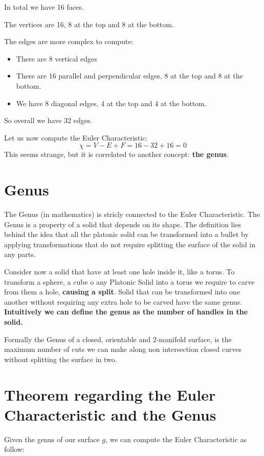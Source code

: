 In total we have 16 faces.\par

The vertices are 16, 8 at the top and 8 at the bottom.\par

The edges are more complex to compute:
\begin{itemize}
    \item There are 8 vertical edges
    \item There are 16 parallel and perpendicular edges, 8 at the top and 8 at the bottom.
    \item We have 8 diagonal edges, 4 at the top and 4 at the bottom.
\end{itemize}

So overall we have 32 edges.\par
Let us now compute the Euler Characteristic:
\begin{equation*}
    \chi = V - E + F = 16 - 32 + 16 = 0 
\end{equation*}
This seems strange, but it is correlated to another concept: \textbf{the genus}.

\section{Genus}
The Genus (in mathematics) is stricly connected to the Euler Characteristic. The Genus is a property of a solid that depends on its shape. The definition lies behind the idea that all the platonic solid can be transformed into a bullet by applying transformations that do not require splitting the surface of the solid in any parts. \par
Consider now a solid that have at least one hole inside it, like a torus. To transform a sphere, a cube o any Platonic Solid into a torus we require to carve from them a hole, \textbf{causing a split}.
Solid that can be transformed into one another without requiring any extra hole to be carved have the same genus. \textbf{Intuitively we can define the genus as the number of handles in the solid.}\par
Formally the Genus of a closed, orientable and 2-manifold surface, is the maximum number of cuts we can make along non intersection closed curves without splitting the surface in two.

\section{Theorem regarding the Euler Characteristic and the Genus}
Given the genus of our surface $g$, we can compute the Euler Characteristic as follow:

